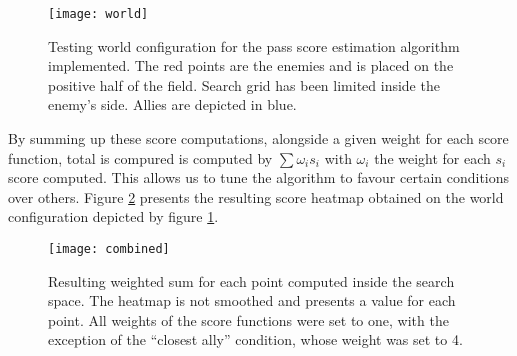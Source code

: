\begin{figure}[h]
    \centering
    \texttt{[image: world]}
    \caption{Testing world configuration for the pass score estimation algorithm implemented. The red points are the enemies and
    is placed on the positive half of the field. Search grid has been limited inside the enemy's side. Allies are depicted in blue.}
    \label{fig:world-setup}
\end{figure}


By summing up these score computations, alongside a given weight for each score function, total is compured is computed by $\sum{\omega_{i}s_i}$ with $\omega_i$ the weight for each $s_i$ score computed.
This allows us to tune the algorithm to favour certain conditions over others. Figure \ref{fig:combined} presents the resulting score heatmap obtained
on the world configuration depicted by figure \ref{fig:world-setup}.

\begin{figure}[h]
    \centering
    \texttt{[image: combined]}
    \caption{Resulting weighted sum for each point computed inside the search space. The heatmap is not smoothed
    and presents a value for each point. All weights of the score functions were set to one, with the exception of the ``closest ally'' condition,
    whose weight was set to 4.}
    \label{fig:combined}
\end{figure}
